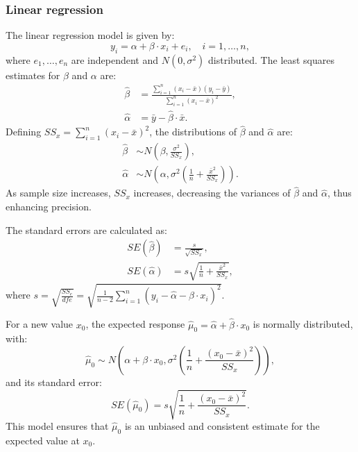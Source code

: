 \documentclass{article}
\begin{document}
\subsubsection{Linear regression}
The linear regression model is given by:
\begin{equation}
y_i = \alpha + \beta \cdot x_i + e_i, \quad i = 1, \ldots, n, \tag{5.15}
\end{equation}
where \(e_1, \ldots, e_n\) are independent and \(N(0, \sigma^2)\) distributed. The least squares estimates for \(\beta\) and \(\alpha\) are:
\begin{align}
\hat{\beta} &= \frac{\sum_{i=1}^{n}(x_i - \bar{x})(y_i - \bar{y})}{\sum_{i=1}^{n}(x_i - \bar{x})^2}, \\
\hat{\alpha} &= \bar{y} - \hat{\beta} \cdot \bar{x}.
\end{align}
Defining \(SS_x = \sum_{i=1}^{n}(x_i - \bar{x})^2\), the distributions of \(\hat{\beta}\) and \(\hat{\alpha}\) are:
\begin{align}
\hat{\beta} &\sim N\left(\beta, \frac{\sigma^2}{SS_x}\right), \\
\hat{\alpha} &\sim N\left(\alpha, \sigma^2\left(\frac{1}{n} + \frac{\bar{x}^2}{SS_x}\right)\right).
\end{align}
As sample size increases, \(SS_x\) increases, decreasing the variances of \(\hat{\beta}\) and \(\hat{\alpha}\), thus enhancing precision.

The standard errors are calculated as:
\begin{align}
SE(\hat{\beta}) &= \frac{s}{\sqrt{SS_x}}, \\
SE(\hat{\alpha}) &= s \sqrt{\frac{1}{n} + \frac{\bar{x}^2}{SS_x}},
\end{align}
where \(s = \sqrt{\frac{SS_e}{dfe}} = \sqrt{\frac{1}{n - 2} \sum_{i=1}^{n}(y_i - \hat{\alpha} - \hat{\beta} \cdot x_i)^2}\).

For a new value \(x_0\), the expected response \(\hat{\mu}_0 = \hat{\alpha} + \hat{\beta} \cdot x_0\) is normally distributed, with:
\begin{equation}
\hat{\mu}_0 \sim N\left(\alpha + \beta \cdot x_0, \sigma^2\left(\frac{1}{n} + \frac{(x_0 - \bar{x})^2}{SS_x}\right)\right),
\end{equation}
and its standard error:
\begin{equation}
SE(\hat{\mu}_0) = s \sqrt{\frac{1}{n} + \frac{(x_0 - \bar{x})^2}{SS_x}}. \tag{5.16}
\end{equation}
This model ensures that \(\hat{\mu}_0\) is an unbiased and consistent estimate for the expected value at \(x_0\).
\end{document}
